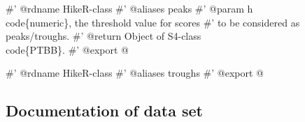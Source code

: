 \documentclass[a4paper]{article}
\begin{document}
\nwenddocs{}\endmoddef
#' @rdname HikeR-class
#' @aliases peaks
#' @param h \\code\{numeric\}, the threshold value for scores
#' to be considered as peaks/troughs.
#' @return Object of S4-class \\code\{PTBB\}.
#' @export
\nwendcode{}@

\nwenddocs{}\endmoddef
#' @rdname HikeR-class
#' @aliases troughs
#' @export
\nwendcode{}@

\subsection{Documentation of data set}
\end{document}
